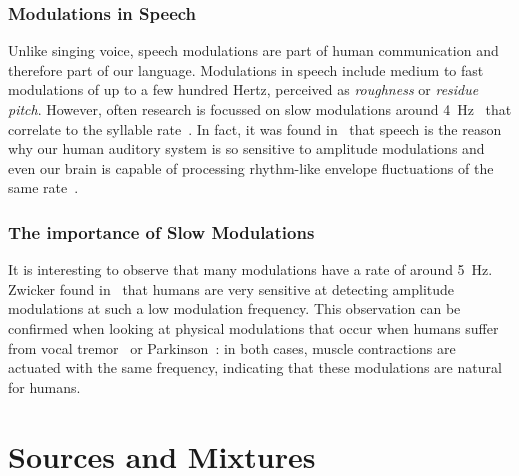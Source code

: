 \subsubsection*{Modulations in Speech}

Unlike singing voice, speech modulations are part of human communication and therefore part of our language.
Modulations in speech include medium to fast modulations of up to a few hundred Hertz, perceived as \emph{roughness} or \emph{residue pitch}.
However, often research is focussed on slow modulations around 4~\si{\hertz}~\cite{greenberg97, fuellgrabe09} that correlate to the syllable rate~\cite{plomp83, houtgast85}.
In fact, it was found in~\cite{joris04} that speech is the reason why our human auditory system is so sensitive to amplitude modulations and even our brain is capable of processing rhythm-like envelope fluctuations of the same rate~\cite{schreiner88, plomp83}.

\subsubsection*{The importance of Slow Modulations}

It is interesting to observe that many modulations have a rate of around 5~\si{\hertz}. 
Zwicker found in~\cite{zwicker52} that humans are very sensitive at detecting amplitude modulations at such a low modulation frequency.
This observation can be confirmed when looking at physical modulations that occur when humans suffer from vocal tremor~\cite{ramig87} or Parkinson~\cite{botzel14}: in both cases, muscle contractions are actuated with the same frequency, indicating that these modulations are natural for humans.

\hypertarget{sources-and-mixtures}{%
\section{Sources and Mixtures}\label{sources-and-mixtures}}

